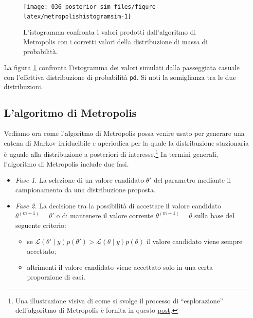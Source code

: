 \documentclass[
  10pt,
  italian,
  a4paper,
  extrafontsizes,onecolumn,openright
  ]{memoir}
\providecommand{\tightlist}{%
  \setlength{\itemsep}{0pt}\setlength{\parskip}{0pt}}
\begin{document}
\begin{figure}[h]

{\centering \texttt{[image: 036\_posterior\_sim\_files/figure-latex/metropolishistogramsim-1]} 

}

\caption{L'istogramma confronta i valori prodotti dall'algoritmo di Metropolis con i corretti valori della distribuzione di massa di probabilità.}\label{fig:metropolishistogramsim}
\end{figure}

\noindent
La figura \ref{fig:metropolishistogramsim} confronta l'istogramma dei valori simulati dalla passeggiata casuale con l'effettiva distribuzione di probabilità \texttt{pd}. Si noti la somiglianza tra le due distribuzioni.

\hypertarget{lalgoritmo-di-metropolis}{%
\subsection{L'algoritmo di Metropolis}\label{lalgoritmo-di-metropolis}}

Vediamo ora come l'algoritmo di Metropolis possa venire usato per generare una catena di Markov irriducibile e aperiodica per la quale la distribuzione stazionaria è uguale alla distribuzione a posteriori di interesse.\footnote{Una illustrazione visiva di come si svolge il processo di ``esplorazione'' dell'algoritmo di Metropolis è fornita in questo \href{https://elevanth.org/blog/2017/11/28/build-a-better-markov-chain/}{post}.} In termini generali, l'algoritmo di Metropolis include due fasi.

\begin{itemize}
\tightlist
\item
  \emph{Fase 1.} La selezione di un valore candidato \(\theta'\) del parametro mediante il campionamento da una distribuzione proposta.
\item
  \emph{Fase 2.} La decisione tra la possibilità di accettare il valore candidato \(\theta^{(m+1)} = \theta'\) o di mantenere il valore corrente \(\theta^{(m+1)} = \theta\) sulla base del seguente criterio:

  \begin{itemize}
  \tightlist
  \item
    se \(\mathcal{L}(\theta' \mid y)p(\theta') > \mathcal{L}(\theta \mid y)p(\theta)\) il valore candidato viene sempre accettato;
  \item
    altrimenti il valore candidato viene accettato solo in una certa proporzione di casi.
  \end{itemize}
\end{itemize}
\end{document}
